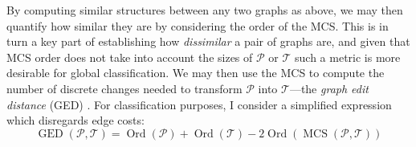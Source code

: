 \documentclass{mpaper}
\begin{document}
By computing similar structures between any two graphs as above, we may then quantify how similar they are by considering the order of the MCS.
This is in turn a key part of establishing how \emph{dissimilar} a pair of graphs are, and given that MCS order does not take into account the sizes of $\mathcal{P}$ or $\mathcal{T}$ such a metric is more desirable for global classification.
We may then use the MCS to compute the number of discrete changes needed to transform $\mathcal{P}$ into $\mathcal{T}$---the \emph{graph edit distance} (GED) \cite{GraphEditDist-MCS}.
For classification purposes, I consider a simplified expression which disregards edge costs:
$$ \operatorname{GED}(\mathcal{P}, \mathcal{T}) = \operatorname{Ord}(\mathcal{P}) + \operatorname{Ord}(\mathcal{T}) - 2 \operatorname{Ord}(\operatorname{MCS}(\mathcal{P}, \mathcal{T})) $$
\end{document}
